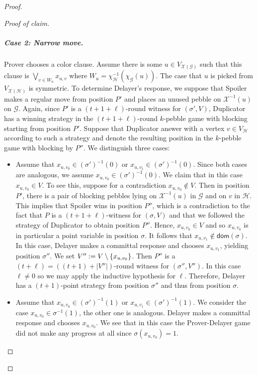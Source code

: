 \documentclass[10pt,a4paper]{article}
\DeclarePairedDelimiter\set{\lbrace}{\rbrace}
\newcommand{\inv}[1]{#1^{-1}}
\newcommand{\graphG}{\mathcal{G}}
\newcommand{\graphH}{\mathcal{H}}
\newcommand{\vertexH}{V_{\graphH}}
\newcommand{\coloringG}{\chi_{\graphG}}
\newcommand{\coloringH}{\chi_{\graphH}}
\newcommand{\dom}{\mathsf{dom}}
\newcommand{\graphXG}{\mathcal{X}(\mathcal{G})}
\newcommand{\graphXH}{\mathcal{X}(\mathcal{H})}
\newcommand{\vertexXG}{V_{\graphXG}}
\newcommand{\vertexXH}{V_{\graphXH}}
\newcommand{\X}{\mathcal{X}}
\newcommand{\XI}{\X^{-1}}
\newenvironment{claimproof}{\begin{proof}[Proof of claim]}{\end{proof}}
\begin{document}
\begin{proof}
\begin{claimproof}
\subparagraph{Case 2: Narrow move.}
Prover chooses a color clause.
Assume there is some $u \in \vertexXG$ such that
this clause is $\bigvee_{v \in W_u} x_{u,v}$ where $W_u = \inv{\coloringH}(\coloringG(u))$.
The case  that $u$ is picked from $\vertexXH$ is symmetric.
To determine Delayer's response, we suppose that Spoiler makes a regular move from position $P'$ and places an unused pebble on $\XI(u)$ on $\graphG$. Again, since $P'$ is a $(t+1+\ell)$-round witness for $(\sigma', V)$, Duplicator has a winning strategy in the $(t+1+\ell)$-round $k$-pebble game with blocking starting from position $P'$. Suppose that Duplicator answer with a vertex $v \in \vertexH$ according to such a strategy and denote the resulting position in the $k$-pebble game with blocking by $P''$. We distinguish three cases:
\begin{itemize}
        \item Assume that $x_{u, v_0} \in (\sigma')^{-1}(0)$ or $x_{u, v_1} \in (\sigma')^{-1}(0)$. Since both cases are analogous,
        we assume $x_{u, v_0} \in (\sigma')^{-1}(0)$.
        We claim that in this case $x_{u, v_0} \in V$.
        To see this, suppose for a contradiction $x_{u,v_0}\notin V$.
        Then in position $P'$, there is a pair of blocking pebbles lying on $\XI(u)$ in $\graphG$ and on $v$ in $\graphH$.
        This implies that Spoiler wins in position $P''$, which is a contradiction
        to the fact that $P$ is a $(t+1+\ell)$-witness for $(\sigma,V)$
        and that we followed the strategy of Duplicator to obtain position $P''$.
        Hence, $x_{u, v_0} \in V$ and so $x_{u, v_0}$ is in particular a point variable in position $\sigma$.
        It follows that $x_{u,v_1} \not\in \dom(\sigma)$. In this case, Delayer makes a committal response and chooses $x_{u,v_1}$, yielding position $\sigma''$.
        We set $V'' :=  V \setminus \set{x_{u, v_0}}$.
        Then $P''$ is a $(t+\ell) = ((t+1)+|V''|)$-round witness for $(\sigma'',V'')$. In this case $\ell \neq 0$ so we may apply the inductive hypothesis for $\ell$. Therefore, Delayer has a $(t+1)$-point strategy from position $\sigma''$ and thus from position $\sigma$.
        \item 
        Assume that $x_{u, v_0} \in (\sigma')^{-1}(1)$ or $x_{u, v_1} \in (\sigma')^{-1}(1)$.
        We consider the case $x_{u, v_0} \in \sigma^{-1}(1)$, the other one is analogous.
        Delayer makes a committal response and chooses $x_{u, v_0}$.
        We see that in this case the Prover-Delayer game did not make any progress at all since $\sigma(x_{u, v_0}) = 1$.

\end{itemize}
\end{claimproof}
\end{proof}
\end{document}
